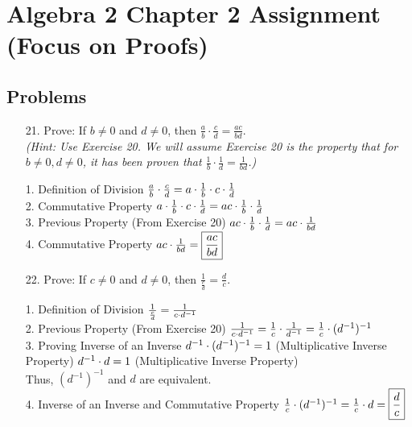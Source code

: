 \documentclass{article}
\begin{document}
\section*{Algebra 2 Chapter 2 Assignment (Focus on Proofs)}
\subsection*{Problems}

\begin{enumerate}
    \item[21.] Prove: If $b \neq 0$ and $d \neq 0$, then $\frac{a}{b} \cdot \frac{c}{d} = \frac{ac}{bd}$. \\
    \textit{(Hint: Use Exercise 20. We will assume Exercise 20 is the property that for $b \neq 0, d \neq 0$, it has been proven that $\frac{1}{b} \cdot \frac{1}{d} = \frac{1}{bd}$.)}

    \begin{minipage}[t][6cm][t]{\linewidth}
        1. Definition of Division
        $\\[8pt] \frac{a}{b} \cdot \frac{c}{d} = a \cdot \frac{1}{b} \cdot c \cdot \frac{1}{d}$
        \\[8pt] 2. Commutative Property
        $\\[8pt] a \cdot \frac{1}{b} \cdot c \cdot \frac{1}{d} = ac \cdot \frac{1}{b} \cdot \frac{1}{d}$
        \\[8pt] 3. Previous Property (From Exercise 20)
        $\\[8pt] ac \cdot \frac{1}{b} \cdot \frac{1}{d} = ac \cdot \frac{1}{bd}$
        \\[8pt] 4. Commutative Property
        $\\[8pt] ac \cdot \frac{1}{bd} = \boxed{\frac{ac}{bd}}$
    \end{minipage}

    \item[22.] Prove: If $c \neq 0$ and $d \neq 0$, then $\frac{1}{\frac{c}{d}} = \frac{d}{c}$.

    \begin{minipage}[t][8cm][t]{\linewidth}
        1. Definition of Division
        $\\[8pt] \frac{1}{\frac{c}{d}} = \frac{1}{c \cdot d^{-1}}$
        \\[8pt] 2. Previous Property (From Exercise 20)
        $\\[8pt] \frac{1}{c \cdot d^{-1}} = \frac{1}{c} \cdot \frac{1}{d^{-1}} = \frac{1}{c} \cdot (d^{-1})^{-1}$
        \\[8pt] 3. Proving Inverse of an Inverse
        $\\[8pt] d^{-1} \cdot (d^{-1})^{-1} = 1$ (Multiplicative Inverse Property)
        $\\[8pt] d^{-1} \cdot d = 1$ (Multiplicative Inverse Property)
        \\[8pt] Thus, $(d^{-1})^{-1}$ and $d$ are equivalent.
        \\[8pt] 4. Inverse of an Inverse and Commutative Property
        $\\[8pt] \frac{1}{c} \cdot (d^{-1})^{-1} = \frac{1}{c} \cdot d = \boxed{\frac{d}{c}}$
    \end{minipage}


\end{enumerate}
\end{document}
